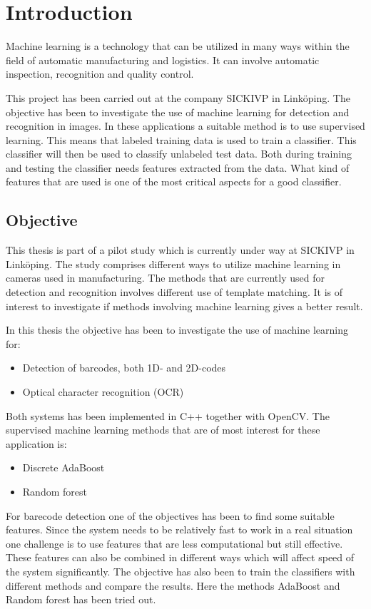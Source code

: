\chapter{Introduction}
\label{sec:introduction}
Machine learning is a technology that can be utilized in many ways within the field of automatic manufacturing and logistics. It can involve automatic inspection, recognition and quality control. 

This project has been carried out at the company SICKIVP in Linköping. The objective has been to investigate the use of machine learning for detection and recognition in images. In these applications a suitable method is to use supervised learning. This means that labeled training data is used to train a classifier. This classifier will then be used to classify unlabeled test data. Both during training and testing the classifier needs features extracted from the data. What kind of features that are used is one of the most critical aspects for a good classifier.

\section{Objective}
This thesis is part of a pilot study which is currently under way at SICKIVP in Linköping. The study comprises different ways to utilize machine learning in cameras used in manufacturing. The methods that are currently used for detection and recognition involves different use of template matching. It is of interest to investigate if methods involving machine learning gives a better result.

In this thesis the objective has been to investigate the use of machine learning for: 
\begin{itemize}
	\item Detection of barcodes, both 1D- and 2D-codes
	\item Optical character recognition (OCR)
\end{itemize}

Both systems has been implemented in C++ together with OpenCV. The supervised machine learning methods that are of most interest for these application is:
\begin{itemize}
	\item Discrete AdaBoost
	\item Random forest
\end{itemize}

For barecode detection one of the objectives has been to find some suitable features. Since the system needs to be relatively fast to work in a real situation one challenge is to use features that are less computational but still effective. These features can also be combined in different ways which will affect speed of the system significantly. The objective has also been to train the classifiers with different methods and compare the results. Here the methods AdaBoost and Random forest has been tried out.

